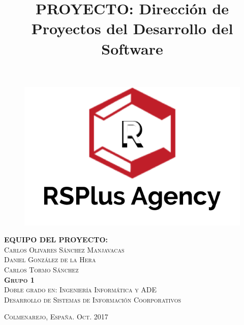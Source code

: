 \title{PROYECTO: Dirección de Proyectos del Desarrollo del Software} %

\begin{titlingpage}
\begin{center}

\begin{figure}[h]

\begin{center}
\includegraphics[width=1\textwidth]{./img/long_logo.png}
\end{center}
\end{figure}

\vfill

\textsc{\LARGE \textbf{EQUIPO DEL PROYECTO:}}\\[2em]
\textsc{\Large Carlos Olivares Sánchez Manjavacas}\\[1em]
\textsc{\Large Daniel González de la Hera}\\[1em]
\textsc{\Large Carlos Tormo Sánchez}\\[10em]

\textsc{\large \textbf{Grupo 1}}\\[1em]

\textsc{Doble grado en: Ingeniería Informática y ADE}\\[1em]

\textsc{Desarrollo de Sistemas de Información Coorporativos}\\[6em]


\end{center}

\textsc{Colmenarejo, España. \hspace*{\fill} Oct. 2017}


\end{titlingpage}
